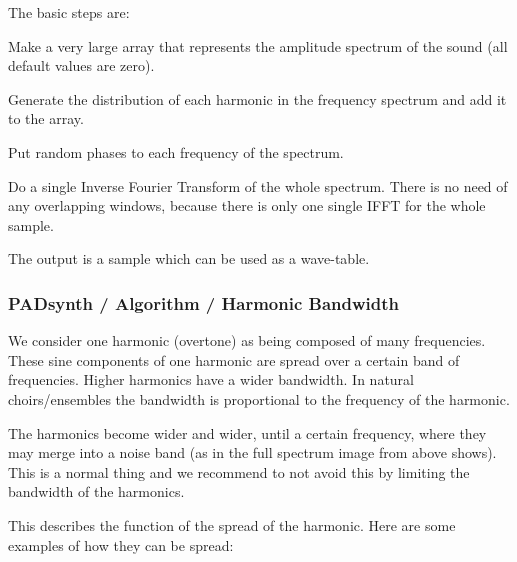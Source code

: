    The basic steps are:

   \begin{enumber}
      \item Make a very large array that represents the amplitude spectrum of
         the sound (all default values are zero).
      \item Generate the distribution of each harmonic in the frequency
         spectrum and add it to the array.
      \item Put random phases to each frequency of the spectrum.
      \item Do a single Inverse Fourier Transform of the whole spectrum. There
         is no need of any overlapping windows, because there is only one
         single IFFT for the whole sample.
   \end{enumber}

   The output is a sample which can be used as a wave-table.


\subsubsection{PADsynth / Algorithm / Harmonic Bandwidth}
\label{subsubsec:padsynth_algorithm_harmonic_bandwidth}

   We consider one harmonic (overtone) as being composed of many frequencies.
   These sine components of one harmonic are spread over a certain band of
   frequencies.  Higher harmonics have a wider bandwidth. In natural
   choirs/ensembles the bandwidth is proportional to the frequency of the
   harmonic.

%

   The harmonics become wider and wider, until a certain frequency, where
   they may merge into a noise band (as in the full spectrum image from above
   shows). This is a normal thing and we recommend to not avoid this by
   limiting the bandwidth of the harmonics.


   This describes the function of the spread of the harmonic.
   Here are some examples of how they can be spread:

